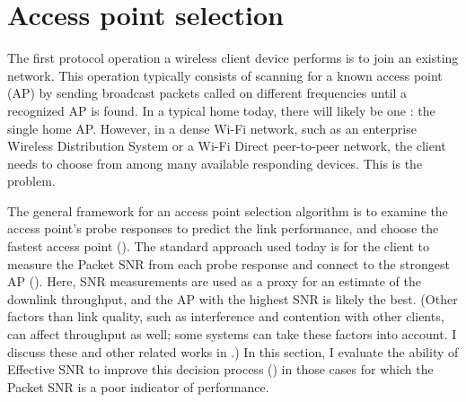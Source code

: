 \section{Access point selection}\label{sec:esnr_apsel}
The first protocol operation a wireless client device performs is to join an existing network. This operation typically consists of scanning for a known access point (AP) by sending broadcast packets called  on different frequencies until a recognized AP is found. In a typical home today, there will likely be one : the single home AP. However, in a dense Wi-Fi network, such as an enterprise Wireless Distribution System or a Wi-Fi Direct peer-to-peer network, the client needs to choose from among many available responding devices. This is the  problem.

The general framework for an access point selection algorithm is to examine the access point's probe responses to predict the link performance, and choose the fastest access point (). The standard approach used today is for the client to measure the Packet SNR from each probe response and connect to the strongest AP (). Here, SNR measurements are used as a proxy for an estimate of the downlink throughput, and the AP with the highest SNR is likely the best. (Other factors than link quality, such as interference and contention with other clients, can affect throughput as well; some systems can take these factors into account. I discuss these and other related works in .)
In this section, I evaluate the ability of Effective SNR to improve this decision process () in those cases for which the Packet SNR is a poor indicator of performance.


